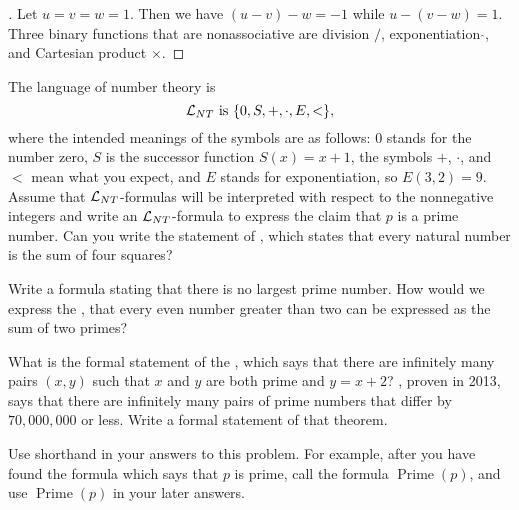 \begin{proof}[]
  Let \(u = v = w = 1\).
  Then we have \((u - v) - w = -1\) while \(u - (v - w) = 1\).
  Three binary functions that are nonassociative are division \(/\), exponentiation \(\hat{}\), and Cartesian product \(\times\).
\end{proof}

\begin{ex}\label{ex:1.3.3}
  The language of number theory is
  \[
    \Lc_{NT} \text{ is } \set{0, S, +, \cdot, E, <},
  \]
  where the intended meanings of the symbols are as follows:
  \(0\) stands for the number zero, \(S\) is the successor function \(S(x) = x + 1\), the symbols \(+\), \(\cdot\), and \(<\) mean what you expect, and \(E\) stands for exponentiation, so \(E(3, 2) = 9\).
  Assume that \(\mathcal{L}_{NT}\)-formulas will be interpreted with respect to the nonnegative integers and write an \(\mathcal{L}_{NT}\)-formula to express the claim that \(p\) is a prime number.
  Can you write the statement of , which states that every natural number is the sum of four squares?

  Write a formula stating that there is no largest prime number.
  How would we express the , that every even number greater than two can be expressed as the sum of two primes?

  What is the formal statement of the , which says that there are infinitely many pairs \((x, y)\) such that \(x\) and \(y\) are both prime and \(y = x + 2\)?
  , proven in 2013, says that there are infinitely many pairs of prime numbers that differ by \(70,000,000\) or less.
  Write a formal statement of that theorem.

  Use shorthand in your answers to this problem.
  For example, after you have found the formula which says that \(p\) is prime, call the formula \(\operatorname{Prime}(p)\), and use \(\operatorname{Prime}(p)\) in your later answers.
\end{ex}

